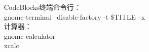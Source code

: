 CodeBlocks终端命令行：\\
gnome-terminal --disable-factory -t \$TITLE –x\\
计算器：\\
gnome-calculator\\
xcalc\\
